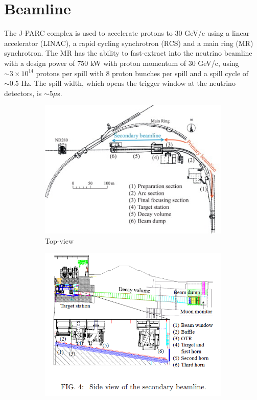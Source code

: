 \section{Beamline}
The J-PARC complex\cite{jparc_tdr} is used to accelerate protons to 30 GeV/c using a linear accelerator (LINAC), a rapid cycling synchrotron (RCS) and a main ring (MR) synchrotron. The MR has the ability to fast-extract into the neutrino beamline with a design power of 750 kW with proton momentum of 30 GeV/c, using $\sim3\times10^{14}$ protons per spill with 8 proton bunches per spill and a spill cycle of $\sim0.5$ Hz. The spill width, which opens the trigger window at the neutrino detectors, is $\sim5 \mu$s\cite{t2k_det}.
\begin{figure}[h]
	\begin{subfigure}[t]{0.4\textwidth}
		\includegraphics[width=\textwidth, trim={0mm 0mm 0mm 0mm}, clip,page=1]{figures/det_chap/beam/beam.jpg}
		\caption{Top-view}
	\end{subfigure}
	\begin{subfigure}[t]{0.4\textwidth}
		\includegraphics[width=\textwidth, trim={0mm 18mm 0mm 0mm}, clip,page=1]{figures/det_chap/beam/sideview_beam}

\end{subfigure}
\end{figure}
